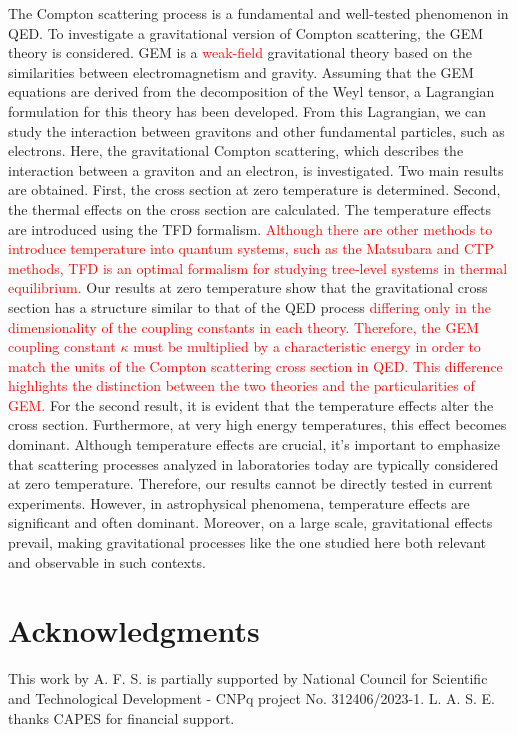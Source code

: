 \documentclass[11pt,showpacs,preprintnumbers,amsmath,amssymb,prd,nofootinbib,superscriptaddress]{revtex4-2}
\begin{document}
The Compton scattering process is a fundamental and well-tested phenomenon in QED. To investigate a gravitational version of Compton scattering, the GEM theory is considered. GEM is a \textcolor{red}{weak-field} gravitational theory based on the similarities between electromagnetism and gravity. Assuming that the GEM equations are derived from the decomposition of the Weyl tensor, a Lagrangian formulation for this theory has been developed. From this Lagrangian, we can study the interaction between gravitons and other fundamental particles, such as electrons. Here, the gravitational Compton scattering, which describes the interaction between a graviton and an electron, is investigated. Two main results are obtained. First, the cross section at zero temperature is determined. Second, the thermal effects on the cross section are calculated. The temperature effects are introduced using the TFD formalism. \textcolor{red}{Although there are other methods to introduce temperature into quantum systems, such as the Matsubara and CTP methods, TFD is an optimal formalism for studying tree-level systems in thermal equilibrium.} Our results at zero temperature show that the gravitational cross section has a structure similar to that of the QED process \textcolor{red}{differing only in the dimensionality of the coupling constants in each theory. Therefore, the GEM coupling constant $\kappa$ must be multiplied by a characteristic energy in order to match the units of the Compton scattering cross section in QED. This difference highlights the distinction between the two theories and the particularities of GEM.} For the second result, it is evident that the temperature effects alter the cross section. Furthermore, at very high energy temperatures, this effect becomes dominant. Although temperature effects are crucial, it's important to emphasize that scattering processes analyzed in laboratories today are typically considered at zero temperature. Therefore, our results cannot be directly tested in current experiments. However, in astrophysical phenomena, temperature effects are significant and often dominant. Moreover, on a large scale, gravitational effects prevail, making gravitational processes like the one studied here both relevant and observable in such contexts.


\section*{Acknowledgments}

This work by A. F. S. is partially supported by National Council for Scientific and Technological Develo\-pment - CNPq project No. 312406/2023-1. L. A. S. E. thanks CAPES for financial support. 
\end{document}
